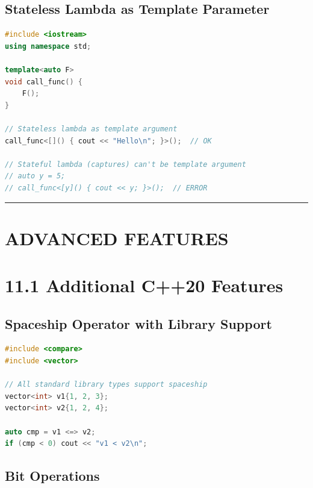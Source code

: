 \hypertarget{stateless-lambda-as-template-parameter}{%
\subsection{Stateless Lambda as Template
Parameter}\label{stateless-lambda-as-template-parameter}}

\begin{lstlisting}[language={C++}]
#include <iostream>
using namespace std;

template<auto F>
void call_func() {
    F();
}

// Stateless lambda as template argument
call_func<[]() { cout << "Hello\n"; }>();  // OK

// Stateful lambda (captures) can't be template argument
// auto y = 5;
// call_func<[y]() { cout << y; }>();  // ERROR
\end{lstlisting}

\begin{center}\rule{0.5\linewidth}{0.5pt}\end{center}

\hypertarget{advanced-features}{%
\section{ADVANCED FEATURES}\label{advanced-features}}

\hypertarget{additional-c20-features}{%
\section{11.1 Additional C++20 Features}\label{additional-c20-features}}

\hypertarget{spaceship-operator-with-library-support}{%
\subsection{Spaceship Operator with Library
Support}\label{spaceship-operator-with-library-support}}

\begin{lstlisting}[language={C++}]
#include <compare>
#include <vector>

// All standard library types support spaceship
vector<int> v1{1, 2, 3};
vector<int> v2{1, 2, 4};

auto cmp = v1 <=> v2;
if (cmp < 0) cout << "v1 < v2\n";
\end{lstlisting}

\hypertarget{bit-operations}{%
\subsection{Bit Operations}\label{bit-operations}}

